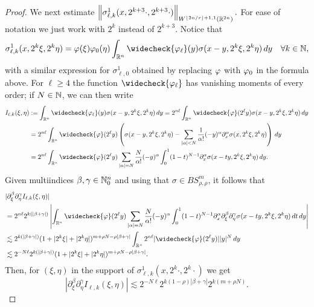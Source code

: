 \begin{proof}
We next estimate $\left\|\sigma^1_{\ell, k}(x, 2^{k+3} \cdot, 2^{k+3} \cdot)\right\|_{W^{\lfloor{2n/r}\rfloor + 1,1}(\mathbb{R}^{2n})}.$ For ease of notation we just work with $2^k$ instead of $2^{k+3}.$ Notice that 
\begin{equation*}
\sigma^1_{\ell, k}(x, 2^k \xi, 2^k \eta) = \f(\xi) \f_0(\eta) \int_{\rn} \widecheck{\f_\ell}(y) \sigma(x-y, 2^k \xi, 2^k \eta)\dy\quad \forall k\in\na,
\end{equation*}
with a similar expression for $\sigma^1_{\ell, 0}$ obtained by replacing $\varphi$ with $\varphi_0$ in the formula above. 
 For $\ell \geq 4$ the function $\widecheck{\f_\ell}$ has vanishing moments of every order; if $N \in \mathbb{N}$, we can then write
\begin{align*}
 I_{\ell, k}(\xi, \eta)&:= \int_{\rn} \widecheck{\f_\ell}(y) \sigma(x-y, 2^k \xi, 2^k \eta)\dy=2^{n \ell}\int_{\rn} \widecheck{\f}(2^{\ell}y) \sigma(x-y, 2^k \xi, 2^k \eta)\dy\\
& = 2^{n \ell} \int_{\rn} \widecheck{\f}(2^{\ell}y) \left( \sigma(x-y, 2^k \xi, 2^k \eta) - \sum\limits_{|\alpha| < N} \frac{1}{\alpha!} (-y)^\alpha \partial_x^\alpha \sigma(x, 2^k \xi, 2^k \eta) \right)\dy\\
& = 2^{n \ell} \int_{\rn} \widecheck{\f}(2^{\ell}y) \sum\limits_{|\alpha| = N} \frac{N}{\alpha!} (-y)^\alpha \int_0^1 (1-t)^{N-1} \partial_x^\alpha \sigma(x - t y, 2^k \xi, 2^k \eta) \dy.
\end{align*}
Given multiindices $\beta, \gamma \in \mathbb{N}_0^n$ and using that $\sigma \in BS^m_{\rho, \rho}$, it follows that
\begin{align*}
& |\partial_\xi^{\beta} \partial_\eta^{\gamma}  I_{\ell, k}(\xi, \eta)|\\
& = 2^{n \ell} 2^{k (|\beta+ \gamma|)}  \left|  \int_{\rn} \widecheck{\f}(2^{\ell}y) \sum\limits_{|\alpha| = N} \frac{N}{\alpha!} (-y)^\alpha \int_0^1 (1-t)^{N-1} \partial_x^\alpha \partial_\xi^{\beta} \partial_\eta^{\gamma}\sigma(x - t y, 2^k \xi, 2^k \eta) \,dt\dy \right| \\
& \lesssim  2^{k (|\beta+ \gamma|)}  (1+ |2^k \xi| + |2^k \eta|)^{m + \rho N -  \rho|\beta+ \gamma|} \int_{\rn} 2^{n \ell} |\widecheck{\f}(2^{\ell}y)| |y|^N \dy \\
&\lesssim 2^{- N \ell} 2^{k (|\beta+ \gamma|)}  (1+ |2^k \xi| + |2^k \eta|)^{m + \rho N -  \rho |\beta+ \gamma|}.
\end{align*}
Then, for $(\xi,\eta)$ in the support of $\sigma^1_{\ell,k}(x, 2^k\cdot,2^k\cdot)$  we get
\begin{equation*}
 |\partial_\xi^{\beta} \partial_\eta^{\gamma}  I_{\ell, k}(\xi, \eta)| \lesssim 2^{- N \ell} 2^{k (1-\rho)|\beta+ \gamma|} 2^{k (m+\rho N)}.

\end{equation*}
\end{proof}
